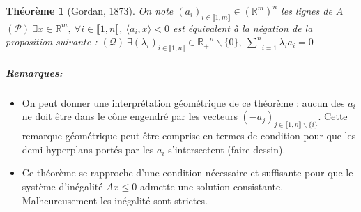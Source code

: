 \documentclass[10pt,a4paper]{article}
\newtheorem{thm}{Théorème}
\begin{document}
\begin{thm}[Gordan, 1873]
  On note $(a_i)_{i \in \llbracket 1,m \rrbracket} \in \left(\mathbb{R}^m \right)^n$ les lignes de $A$
  $(\mathcal{P}) \  \exists x \in \mathbb{R}^m, \ \forall i \in \llbracket 1,n \rrbracket, \ \langle a_i,x \rangle <0$ est équivalent à la négation de la proposition suivante : $ (\mathcal{Q}) \ \exists (\lambda_i)_{i \in \llbracket 1,n \rrbracket}\in \mathbb{R_+}^n \backslash\lbrace 0\rbrace, \ \underset{i=1}{\overset{n}{\sum}} \lambda_i a_i=0$
\end{thm}
\subparagraph{Remarques:}
\begin{itemize}
  \item
    On peut donner une interprétation géométrique de ce théorème : aucun des $a_i$ ne doit être dans le cône engendré par les vecteurs $(-a_j)_{j \in \llbracket 1,n \rrbracket \backslash \lbrace i \rbrace}$.
    Cette remarque géométrique peut être comprise en termes de condition pour que les demi-hyperplans portés par les $a_i$ s'intersectent (faire dessin).
  \item
    Ce théorème se rapproche d'une condition nécessaire et suffisante pour que le système d'inégalité $Ax \leq 0$ admette une solution consistante.
    Malheureusement les inégalité sont strictes.
\end{itemize}
\end{document}
